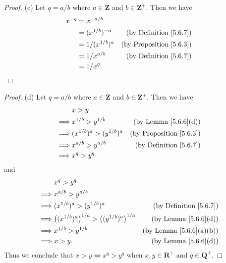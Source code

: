 \begin{proof}{(c)}
    Let \(q = a / b\) where \(a \in \mathbf{Z}\) and \(b \in \mathbf{Z}^+\).
    Then we have
    \begin{align*}
        x^{-q} & = x^{-a / b}                                              \\
               & = (x^{1 / b})^{-a}  & \text{(by Definition \ref{5.6.7})}  \\
               & = 1 / (x^{1 / b})^a & \text{(by Proposition \ref{5.6.3})} \\
               & = 1 / x^{a / b}     & \text{(by Definition \ref{5.6.7})}  \\
               & = 1 / x^q.
    \end{align*}
\end{proof}

\begin{proof}{(d)}
    Let \(q = a / b\) where \(a \in \mathbf{Z}\) and \(b \in \mathbf{Z}^+\).
    Then we have
    \begin{align*}
                 & x > y                                                               \\
        \implies & x^{1 / b} > y^{1 / b}         & \text{(by Lemma \ref{5.6.6}(d))}    \\
        \implies & (x^{1 / b})^a > (y^{1 / b})^a & \text{(by Proposition \ref{5.6.3})} \\
        \implies & x^{a / b} > y^{a / b}         & \text{(by Definition \ref{5.6.7})}  \\
        \implies & x^q > y^q
    \end{align*}
    and
    \begin{align*}
                 & x^q > y^q                                                                                               \\
        \implies & x^{a / b} > y^{a / b}                                                                                   \\
        \implies & (x^{1 / b})^a > (y^{1 / b})^a                                     & \text{(by Definition \ref{5.6.7})}  \\
        \implies & \big((x^{1 / b})^a\big)^{1 / a} > \big((y^{1 / b})^a\big)^{1 / a} & \text{(by Lemma \ref{5.6.6}(d))}    \\
        \implies & x^{1 / b} > y^{1 / b}                                             & \text{(by Lemma \ref{5.6.6}(a)(b))} \\
        \implies & x > y.                                                            & \text{(by Lemma \ref{5.6.6}(d))}
    \end{align*}
    Thus we conclude that \(x > y \iff x^q > y^q\) when \(x, y \in \mathbf{R}^+\) and \(q \in \mathbf{Q}^+\).
\end{proof}

